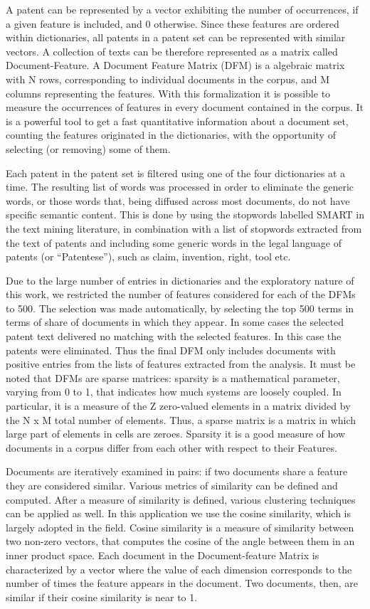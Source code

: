 \documentclass[b5paper,]{book}
\theoremstyle{definition}
\theoremstyle{definition}
\theoremstyle{definition}
\theoremstyle{remark}
\begin{document}
A patent can be represented by a vector exhibiting the number of
occurrences, if a given feature is included, and 0 otherwise. Since
these features are ordered within dictionaries, all patents in a patent
set can be represented with similar vectors. A collection of texts can
be therefore represented as a matrix called Document-Feature. A Document
Feature Matrix (DFM) is a algebraic matrix with N rows, corresponding to
individual documents in the corpus, and M columns representing the
features. With this formalization it is possible to measure the
occurrences of features in every document contained in the corpus. It is
a powerful tool to get a fast quantitative information about a document
set, counting the features originated in the dictionaries, with the
opportunity of selecting (or removing) some of them.

Each patent in the patent set is filtered using one of the four
dictionaries at a time. The resulting list of words was processed in
order to eliminate the generic words, or those words that, being
diffused across most documents, do not have specific semantic content.
This is done by using the stopwords labelled SMART in the text mining
literature, in combination with a list of stopwords extracted from the
text of patents and including some generic words in the legal language
of patents (or ``Patentese''), such as claim, invention, right, tool
etc.

Due to the large number of entries in dictionaries and the exploratory
nature of this work, we restricted the number of features considered for
each of the DFMs to 500. The selection was made automatically, by
selecting the top 500 terms in terms of share of documents in which they
appear. In some cases the selected patent text delivered no matching
with the selected features. In this case the patents were eliminated.
Thus the final DFM only includes documents with positive entries from
the lists of features extracted from the analysis. It must be noted that
DFMs are sparse matrices: sparsity is a mathematical parameter, varying
from 0 to 1, that indicates how much systems are loosely coupled. In
particular, it is a measure of the Z zero-valued elements in a matrix
divided by the N x M total number of elements. Thus, a sparse matrix is
a matrix in which large part of elements in cells are zeroes. Sparsity
it is a good measure of how documents in a corpus differ from each other
with respect to their Features.

Documents are iteratively examined in pairs: if two documents share a
feature they are considered similar. Various metrics of similarity can
be defined and computed. After a measure of similarity is defined,
various clustering techniques can be applied as well. In this
application we use the cosine similarity, which is largely adopted in
the field. Cosine similarity is a measure of similarity between two
non-zero vectors, that computes the cosine of the angle between them in
an inner product space. Each document in the Document-feature Matrix is
characterized by a vector where the value of each dimension corresponds
to the number of times the feature appears in the document. Two
documents, then, are similar if their cosine similarity is near to 1.
\end{document}

